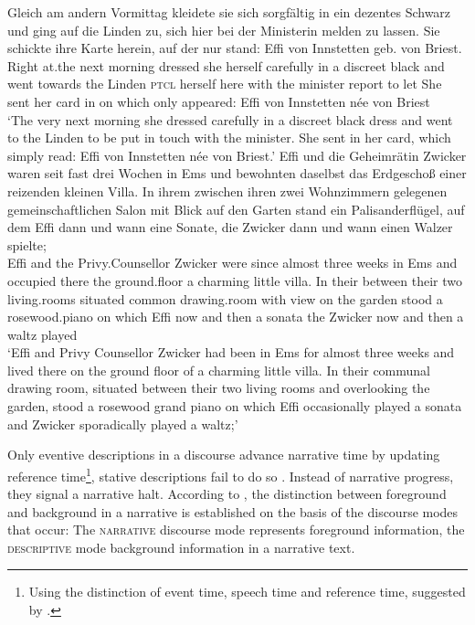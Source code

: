 \documentclass[output=paper,colorlinks,citecolor=brown]{langscibook}
\begin{document}
\eal \label{ex:dm}
\ex \label{ex:event}
\gll Gleich am andern Vormittag kleidete sie sich sorgfältig in ein dezentes Schwarz und ging auf die Linden zu, sich hier bei der Ministerin melden zu lassen. Sie schickte ihre Karte herein, auf der nur stand: Effi von Innstetten geb. von Briest. \\ Right at.the next morning dressed she herself carefully in a discreet black and went towards the Linden \textsc{ptcl} herself here with the minister report to let She sent her card in on which only appeared: Effi von Innstetten née von Briest   \\
\glt `The very next morning she dressed carefully in a discreet black dress and went to the Linden to be put in touch with the minister. She sent in her card, which simply read: Effi von Innstetten née von Briest.' 
\ex \label{ex:state}
\gll Effi und die Geheimrätin Zwicker waren seit fast drei Wochen in Ems und bewohnten daselbst das Erdgescho\ss{} einer reizenden kleinen Villa. In ihrem zwischen ihren zwei Wohnzimmern gelegenen gemeinschaftlichen Salon mit Blick auf den Garten stand ein Palisanderflügel, auf dem Effi dann und wann eine Sonate, die Zwicker dann und wann einen Walzer spielte;\\  Effi and the Privy.Counsellor Zwicker were since almost three weeks in Ems and occupied there the ground.floor a charming little villa. In their between their two living.rooms situated common drawing.room with view on the garden stood a rosewood.piano on which Effi now and then a sonata the Zwicker now and then a waltz played \\
\glt `Effi and Privy Counsellor Zwicker had been in Ems for almost three weeks and lived there on the ground floor of a charming little villa. In their communal drawing room, situated between their two living rooms and overlooking the garden, stood a rosewood grand piano on which Effi occasionally played a sonata and Zwicker sporadically played a waltz;' 
\zl

Only eventive descriptions in a discourse advance narrative time by updating reference time\footnote{Using the distinction of event time, speech time and reference time, suggested by \citet{Reichenbach1947}.}, stative descriptions fail to do so  \citep{hinrichs1986,partee1984,dry1983}. Instead of narrative progress, they signal a narrative halt. According to \textcite[35]{Smith2003}, the distinction between foreground and background in a narrative is established on the basis of the discourse modes that occur: The \textsc{narrative} discourse mode represents foreground information, the \textsc{descriptive} mode background information in a narrative text. 
\end{document}
